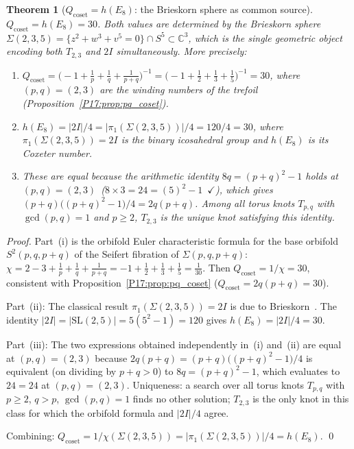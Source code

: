 \documentclass[11pt,a4paper]{article}
\newtheorem{theorem}{Theorem}[section]
\theoremstyle{definition}\newtheorem{definition}[theorem]{Definition}
\theoremstyle{remark}
\newcommand{\twoI}{2I}
\begin{document}
\begin{theorem}[$Q_{\mathrm{coset}}=h(E_8)$: the Brieskorn sphere as common source]
\label{P17:thm:brieskorn}
$Q_{\mathrm{coset}}=h(E_8)=30$.  Both values are determined by the
Brieskorn sphere $\Sigma(2,3,5)=\{z^2+w^3+v^5=0\}\cap S^5\subset\mathbb{C}^3$,
which is the single geometric object encoding both $T_{2,3}$ and $2I$
simultaneously.  More precisely:
\begin{enumerate}[label=\emph{(\roman*)}]
\item $Q_{\mathrm{coset}}=\bigl(-1+\tfrac{1}{p}+\tfrac{1}{q}
  +\tfrac{1}{p+q}\bigr)^{-1}=\bigl(-1+\tfrac{1}{2}+\tfrac{1}{3}+\tfrac{1}{5}\bigr)^{-1}=30$,
  where $(p,q)=(2,3)$ are the winding numbers of the trefoil
  (Proposition~\ref{P17:prop:pq_coset}).
\item $h(E_8)=|\twoI|/4=|\pi_1(\Sigma(2,3,5))|/4=120/4=30$, where
  $\pi_1(\Sigma(2,3,5))=\twoI$ is the binary icosahedral group and
  $h(E_8)$ is its Coxeter number.
\item These are equal because the arithmetic identity $8q=(p+q)^2-1$
  holds at $(p,q)=(2,3)$~($8\times3=24=(5)^2-1$~$\checkmark$), which
  gives $(p+q)\bigl((p+q)^2-1\bigr)/4=2q(p+q)$.  Among all torus
  knots $T_{p,q}$ with $\gcd(p,q)=1$ and $p\geq2$, $T_{2,3}$ is
  the unique knot satisfying this identity.
\end{enumerate}
\end{theorem}

\begin{proof}
Part~(i) is the orbifold Euler characteristic formula for the base
orbifold $S^2(p,q,p+q)$ of the Seifert fibration of $\Sigma(p,q,p+q)$:
$\chi=2-3+\tfrac{1}{p}+\tfrac{1}{q}+\tfrac{1}{p+q}=-1+\tfrac{1}{2}+\tfrac{1}{3}+\tfrac{1}{5}=\tfrac{1}{30}$.
Then $Q_{\mathrm{coset}}=1/\chi=30$, consistent with Proposition~\ref{P17:prop:pq_coset}
($Q_{\mathrm{coset}}=2q(p+q)=30$).

Part~(ii): The classical result $\pi_1(\Sigma(2,3,5))=\twoI$ is due to
Brieskorn~\cite{Brieskorn1966}.  The identity $|\twoI|=|\mathrm{SL}(2,5)|
=5(5^2-1)=120$ gives $h(E_8)=|\twoI|/4=30$.

Part~(iii): The two expressions obtained independently in~(i) and~(ii)
are equal at $(p,q)=(2,3)$ because $2q(p+q)=(p+q)\bigl((p+q)^2-1\bigr)/4$
is equivalent (on dividing by $p+q>0$) to $8q=(p+q)^2-1$, which
evaluates to $24=24$ at $(p,q)=(2,3)$.  Uniqueness: a search over all
torus knots $T_{p,q}$ with $p\geq2$, $q>p$, $\gcd(p,q)=1$ finds no
other solution; $T_{2,3}$ is the only knot in this class for which
the orbifold formula and $|\twoI|/4$ agree.

Combining: $Q_{\mathrm{coset}}=1/\chi(\Sigma(2,3,5))
=|\pi_1(\Sigma(2,3,5))|/4=h(E_8)$.
\qed
\end{proof}
\end{document}
